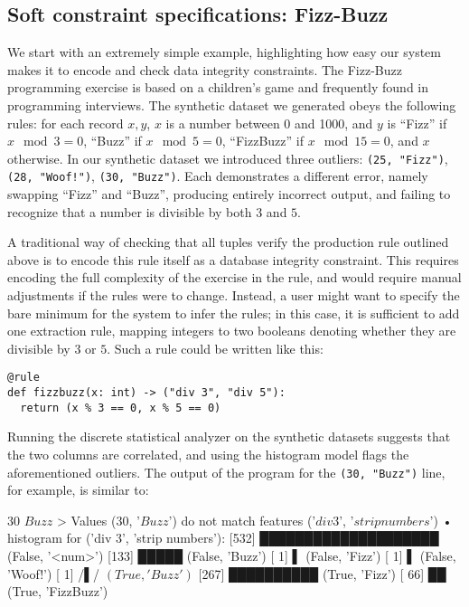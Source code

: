 \subsection{Soft constraint specifications: Fizz-Buzz}
We start with an extremely simple example, highlighting how easy our system makes it to encode and check data integrity constraints. The Fizz-Buzz programming exercise is based on a children's game and frequently found in programming interviews. The synthetic dataset we generated obeys the following rules: for each record \(x, y\), $x$ is a number between 0 and 1000, and $y$ is ``Fizz'' if \(x \mod 3 = 0\), ``Buzz'' if \(x \mod 5 = 0\), ``FizzBuzz'' if \(x \mod 15 = 0\), and \(x\) otherwise. In our synthetic dataset we introduced three outliers: \texttt{(25, "Fizz")}, \texttt{(28, "Woof!")}, \texttt{(30, "Buzz")}. Each demonstrates a different error, namely swapping ``Fizz'' and ``Buzz'', producing entirely incorrect output, and failing to recognize that a number is divisible by both $3$ and $5$.

A traditional way of checking that all tuples verify the production rule outlined above is to encode this rule itself as a database integrity constraint. This requires encoding the full complexity of the exercise in the rule, and would require manual adjustments if the rules were to change. Instead, a user might want to specify the bare minimum for the system to infer the rules; in this case, it is sufficient to add one extraction rule, mapping integers to two booleans denoting whether they are divisible by $3$ or $5$. Such a rule could be written like this:

\begin{verbatim}
@rule
def fizzbuzz(x: int) -> ("div 3", "div 5"):
  return (x % 3 == 0, x % 5 == 0)
\end{verbatim}

Running the discrete statistical analyzer on the synthetic datasets suggests that the two columns are correlated, and using the histogram model flags the aforementioned outliers. The output of the program for the \texttt{(30, "Buzz")} line, for example, is similar to:

\begin{lstnobreak}[gobble=2]
   $30$ $Buzz$
   > Values ($30$, '$Buzz$') do not
     match features ('$div 3$', '$strip numbers$')
   • histogram for ('div 3', 'strip numbers'):
     [532] ████████████████████ (False, '<num>')
     [133] █████ (False, 'Buzz')
     [  1] ▌ (False, 'Fizz')
     [  1] ▌ (False, 'Woof!')
     [  1] /▌/ $(True, 'Buzz')$
     [267] ██████████ (True, 'Fizz')
     [ 66] ██ (True, 'FizzBuzz')
\end{lstnobreak}


